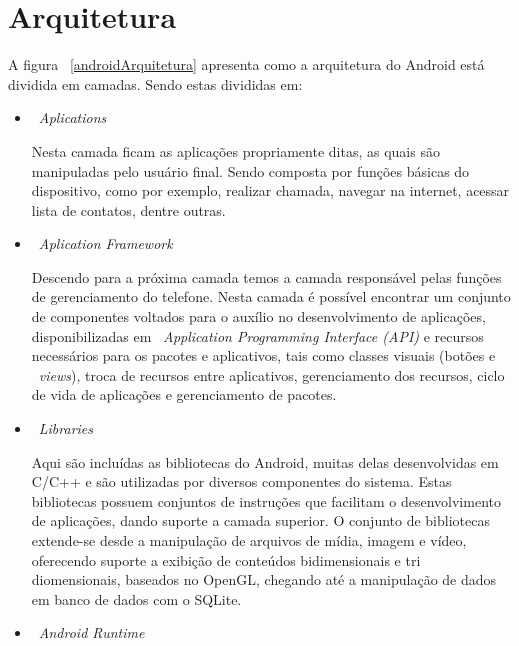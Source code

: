 	\section{Arquitetura}
	
		A figura ~\ref{androidArquitetura} apresenta como a arquitetura do Android está dividida em camadas.
		Sendo estas divididas em:
	
		\begin{itemize}
			\item{ ~\emph{Aplications} \\}
			
				Nesta camada ficam as aplicações propriamente ditas, as quais são manipuladas pelo usuário
				final. Sendo composta por funções básicas do dispositivo, como por exemplo, realizar chamada,
				navegar na internet, acessar lista de contatos, dentre outras. \\
			
			\item{~\emph{Aplication Framework} \\}
			
				Descendo para a próxima camada temos a camada responsável pelas funções de gerenciamento do
				telefone. Nesta camada é possível encontrar um conjunto de componentes voltados para o auxílio
				no desenvolvimento de aplicações, disponibilizadas em ~\textit{Application Programming Interface
				(API)} e recursos necessários para os pacotes e aplicativos, tais como classes visuais (botões
				e ~\textit{views}), troca de recursos entre aplicativos, gerenciamento dos recursos, ciclo de
				vida de aplicações e gerenciamento de pacotes. \\
					
			\item{~\emph{Libraries} \\}
			
				Aqui são incluídas as bibliotecas do Android, muitas delas desenvolvidas em C/C++ e são
				utilizadas por diversos componentes do sistema. Estas bibliotecas possuem conjuntos de
				instruções que facilitam o desenvolvimento de aplicações, dando suporte a camada superior.
				O conjunto de bibliotecas extende-se desde a manipulação de arquivos de mídia, imagem e vídeo,
				oferecendo suporte a exibição de conteúdos bidimensionais e tri diomensionais, baseados no
				OpenGL, chegando até a manipulação de dados em banco de dados com o SQLite.\\
				
			\item{~\emph{Android Runtime} \\}
			

\end{itemize}
